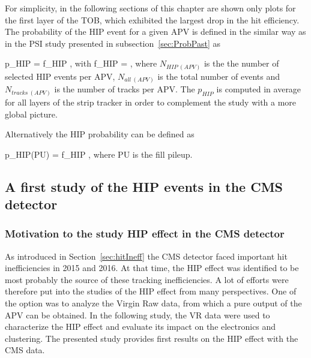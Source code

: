 
For simplicity, in the following sections of this chapter are shown only plots for the first layer of the TOB, which exhibited the largest drop in the hit efficiency. The probability of the HIP event for a given APV is defined in the similar way as in the PSI study presented in subsection~\ref{sec:ProbPast} as


{
p_{HIP} = f_{HIP} ,
}
with
{
f_{HIP} = ,
}
where $N_{HIP~(APV)}$ is the the number of selected HIP events per APV, $N_{all~(APV)}$ is the total number of events and $N_{tracks~(APV)}$ is the number of tracks per APV. The $p_{HIP}$ is computed in average for all layers of the strip tracker in order to complement the study with a more global picture.

Alternatively the HIP probability can be defined as

{
p_{HIP}(PU) = f_{HIP} ,
}
where PU is the fill pileup. 



\subsection{A first study of the HIP events in the CMS detector~\label{sec:firstStudy}}

\subsubsection{Motivation to the study HIP effect in the CMS detector}

As introduced in Section~\ref{sec:hitIneff} the CMS detector faced important hit inefficiencies in 2015 and 2016. At that time, the HIP effect was identified to be most probably the source of these tracking inefficiencies. A lot of efforts were therefore put into the studies of the HIP effect from many perspectives. One of the option was to analyze the Virgin Raw data, from which a pure output of the APV can be obtained. In the following study, the VR data were used to characterize the HIP effect and evaluate its impact on the electronics and clustering. The presented study provides first results on the HIP effect with the CMS data.

